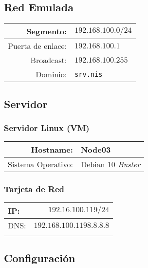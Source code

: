 \documentclass[../main.tex]{subfiles}
\begin{document}
\subsection{Red Emulada}\label{sec:red_emu}

\begin{table}[H]
  \centering
  \begin{tabular}{|rl|}
    \hline
    Segmento:&$192.168.100.0/24$\\\hline
    Puerta de enlace:&$192.168.100.1$\\\hline
    Broadcast:&$192.168.100.255$\\\hline
    Dominio:&\lstinline|srv.nis|\\\hline
  \end{tabular}
\end{table}

\subsection{Servidor}\label{sec:servidor}

\subsubsection{Servidor Linux (VM)}\label{sec:slvm}


\begin{table}[H]
  \centering
  \begin{tabular}{|rl|}
    \hline
    Hostname: &Node03\\\hline{}
    Sistema Operativo: & Debian 10 \textit{Buster}\\\hline
  \end{tabular}
\end{table}

\subsubsection{Tarjeta de Red}\label{sec:tr}

\begin{table}[H]
  \centering
  \begin{tabular}{|lr|}
    \hline{}
    IP:&$192.16.100.119/24$\\\hline{}
    DNS:&$192.168.100.119 8.8.8.8$\\\hline{}
  \end{tabular}
\end{table}

\subsection{Configuración}\label{sec:serv_conf}
\end{document}
